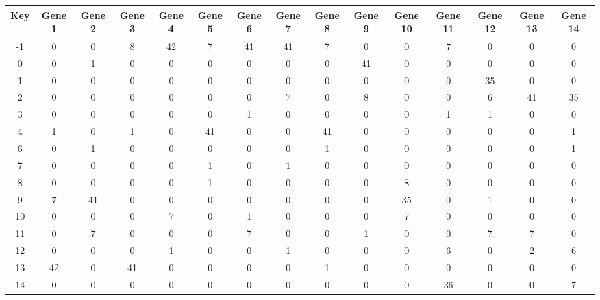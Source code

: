 \begin{tabular}{|c|c|c|c|c|c|c|c|c|c|c|c|c|c|c|}
\hline
Key & Gene 1 & Gene 2 & Gene 3 & Gene 4 & Gene 5 & Gene 6 & Gene 7 & Gene 8 & Gene 9 & Gene 10 & Gene 11 & Gene 12 & Gene 13 & Gene 14 \\
\hline
-1 & 0 & 0 & 8 & 42 & 7 & 41 & 41 & 7 & 0 & 0 & 7 & 0 & 0 & 0 \\
0 & 0 & 1 & 0 & 0 & 0 & 0 & 0 & 0 & 41 & 0 & 0 & 0 & 0 & 0 \\
1 & 0 & 0 & 0 & 0 & 0 & 0 & 0 & 0 & 0 & 0 & 0 & 35 & 0 & 0 \\
2 & 0 & 0 & 0 & 0 & 0 & 0 & 7 & 0 & 8 & 0 & 0 & 6 & 41 & 35 \\
3 & 0 & 0 & 0 & 0 & 0 & 1 & 0 & 0 & 0 & 0 & 1 & 1 & 0 & 0 \\
4 & 1 & 0 & 1 & 0 & 41 & 0 & 0 & 41 & 0 & 0 & 0 & 0 & 0 & 1 \\
6 & 0 & 1 & 0 & 0 & 0 & 0 & 0 & 1 & 0 & 0 & 0 & 0 & 0 & 1 \\
7 & 0 & 0 & 0 & 0 & 1 & 0 & 1 & 0 & 0 & 0 & 0 & 0 & 0 & 0 \\
8 & 0 & 0 & 0 & 0 & 1 & 0 & 0 & 0 & 0 & 8 & 0 & 0 & 0 & 0 \\
9 & 7 & 41 & 0 & 0 & 0 & 0 & 0 & 0 & 0 & 35 & 0 & 1 & 0 & 0 \\
10 & 0 & 0 & 0 & 7 & 0 & 1 & 0 & 0 & 0 & 7 & 0 & 0 & 0 & 0 \\
11 & 0 & 7 & 0 & 0 & 0 & 7 & 0 & 0 & 1 & 0 & 0 & 7 & 7 & 0 \\
12 & 0 & 0 & 0 & 1 & 0 & 0 & 1 & 0 & 0 & 0 & 6 & 0 & 2 & 6 \\
13 & 42 & 0 & 41 & 0 & 0 & 0 & 0 & 1 & 0 & 0 & 0 & 0 & 0 & 0 \\
14 & 0 & 0 & 0 & 0 & 0 & 0 & 0 & 0 & 0 & 0 & 36 & 0 & 0 & 7 \\
\hline
\end{tabular}